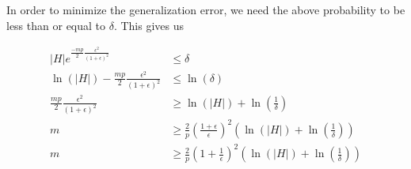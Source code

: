 \begin{enumerate}
In order to minimize the generalization error, we need the above probability to be less than or equal to $\delta$. This gives us

\begin{equation*}
\begin{aligned}
\left | H \right | e^ {\frac{-mp}{2} \frac{\epsilon^2}{(1+\epsilon)^2}} &\leq \delta\\
\ln(\left | H \right | ) - \frac{mp}{2} \frac{\epsilon^2}{(1+\epsilon)^2}&\leq \ln(\delta)\\
\frac{mp}{2} \frac{\epsilon^2}{(1+\epsilon)^2} &\geq \ln(\left | H \right | ) + \ln\left(\frac{1}{\delta}\right)\\
m &\geq \frac{2}{p} \left(\frac{1+\epsilon}{\epsilon}\right)^2 \left(\ln(\left | H \right | ) + \ln \left ( \frac{1}{\delta} \right )\right)\\
m &\geq \frac{2}{p} \left(1+\frac{1}{\epsilon}\right)^2 \left(\ln(\left | H \right | ) + \ln \left ( \frac{1}{\delta} \right )\right)
\end{aligned}
\end{equation*}

\end{enumerate}

